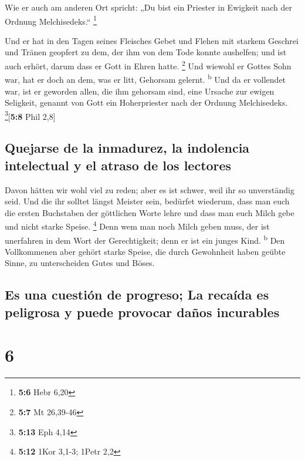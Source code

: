  Wie er auch am anderen Ort spricht: „Du bist ein Priester
in Ewigkeit nach der Ordnung Melchisedeks.`` \footnote{\textbf{5:6} Hebr
  6,20}

 Und er hat in den Tagen seines Fleisches Gebet und Flehen
mit starkem Geschrei und Tränen geopfert zu dem, der ihm von dem Tode
konnte aushelfen; und ist auch erhört, darum dass er Gott in Ehren
hatte. \footnote{\textbf{5:7} Mt 26,39-46}  Und wiewohl er
Gottes Sohn war, hat er doch an dem, was er litt, Gehorsam gelernt.
\textsuperscript{b}  Und da er vollendet war, ist er
geworden allen, die ihm gehorsam sind, eine Ursache zur ewigen
Seligkeit,  genannt von Gott ein Hoherpriester nach der
Ordnung Melchisedeks. \footnote{\textbf{5:13} Eph 4,14}{[}\textbf{5:8}
Phil 2,8{]}

\hypertarget{quejarse-de-la-inmadurez-la-indolencia-intelectual-y-el-atraso-de-los-lectores}{%
\subsection{Quejarse de la inmadurez, la indolencia intelectual y el
atraso de los
lectores}\label{quejarse-de-la-inmadurez-la-indolencia-intelectual-y-el-atraso-de-los-lectores}}

 Davon hätten wir wohl viel zu reden; aber es ist schwer,
weil ihr so unverständig seid.  Und die ihr solltet
längst Meister sein, bedürfet wiederum, dass man euch die ersten
Buchstaben der göttlichen Worte lehre und dass man euch Milch gebe und
nicht starke Speise. \footnote{\textbf{5:12} 1Kor 3,1-3; 1Petr 2,2}
 Denn wem man noch Milch geben muss, der ist unerfahren
in dem Wort der Gerechtigkeit; denn er ist ein junges Kind.
\textsuperscript{b}  Den Vollkommenen aber gehört starke
Speise, die durch Gewohnheit haben geübte Sinne, zu unterscheiden Gutes
und Böses.

\hypertarget{es-una-cuestiuxf3n-de-progreso-la-recauxedda-es-peligrosa-y-puede-provocar-dauxf1os-incurables}{%
\subsection{Es una cuestión de progreso; La recaída es peligrosa y puede
provocar daños
incurables}\label{es-una-cuestiuxf3n-de-progreso-la-recauxedda-es-peligrosa-y-puede-provocar-dauxf1os-incurables}}

\hypertarget{section-5}{%
\section{6}\label{section-5}}

